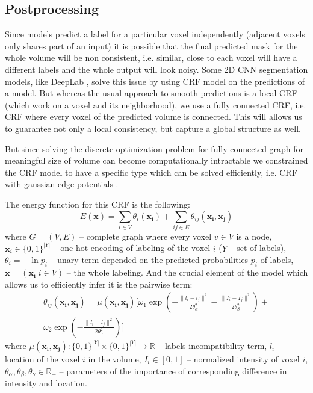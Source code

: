 \documentclass[twocolumn, a4paper]{article}
\theoremstyle{definition}
\begin{document}
\subsection{Postprocessing}
Since models predict a label for a particular voxel independently
(adjacent voxels only shares part of an input) it is possible that the final predicted
mask for the whole volume will be non consistent, i.e. similar, close to each voxel will have
a different labels and the whole output will look noisy. Some 2D CNN segmentation models, like DeepLab \cite{chen2017deeplab},
solve this issue by using CRF model on the predictions of a model. But whereas the usual approach
to smooth predictions is a local CRF (which work on a voxel and its neighborhood), we use a fully connected CRF,
i.e. CRF where every voxel of the predicted volume is connected. This
will allows us to guarantee not only a local consistency, but capture a global structure as well.

But since solving the discrete optimization problem for fully connected graph for meaningful
size of volume can become computationally intractable we constrained the CRF model to have
a specific type which can be solved efficiently, i.e. CRF with gaussian edge potentials \cite{krahenbuhl2011efficient}.

The energy function for this CRF is the following:
\begin{equation*}
    E(\mathbf{x}) =\sum\limits_{i \in V} \theta_i (\mathbf{x_i}) +
    \sum\limits_{ij \in E} \theta_{ij} (\mathbf{x_i}, \mathbf{x_j})
\end{equation*}
where \( G = (V, E) \) -- complete graph where every voxel \( v \in V \) is a node,
\(\mathbf{x}_i \in \{0, 1\}^{|Y|} \) -- one hot encoding of labeling of the voxel \( i \) (\(Y\) -- set of labels),
\( \theta_i = -\ln{p_i} \) -- unary term depended on the predicted probabilities \( p_i \) of labels,
\(\mathbf{x} = (\mathbf{x_i} | i \in V) \) -- the whole labeling.
And the crucial element of the model which allows us to efficiently infer it is the pairwise term:
\begin{equation}  \label{eq:crf_pairwise_term}
    \begin{aligned}
        \theta_{ij} (\mathbf{x_i}, \mathbf{x_j}) = \mu(\mathbf{x_i}, \mathbf{x_j})
        \Bigg[ \omega_1 \exp \left( -\frac{\| l_i - l_j \|^2}{2 \theta_{\alpha}^2}
        -\frac{\| I_i - I_j \|^2}{2 \theta_{\beta}^2} \right) + \\
            \omega_2 \exp \left( -\frac{\| l_i - l_j \|^2}{2 \theta_{\gamma}^2} \right) \Bigg]
    \end{aligned}
\end{equation}
where \( \mu(\mathbf{x_i}, \mathbf{x_j}): \{0, 1\}^{|Y|} \times \{0, 1\}^{|Y|} \to \mathbb{R} \)
-- labels incompatibility term, \( l_i \) -- location of the voxel \( i \) in the volume,
\( I_i \in [0, 1] \) -- normalized intensity of voxel \( i \),
\( \theta_{\alpha}, \theta_{\beta}, \theta_{\gamma} \in \mathbb{R}_+ \) -- parameters of the
importance of corresponding difference in intensity and location.
\end{document}
